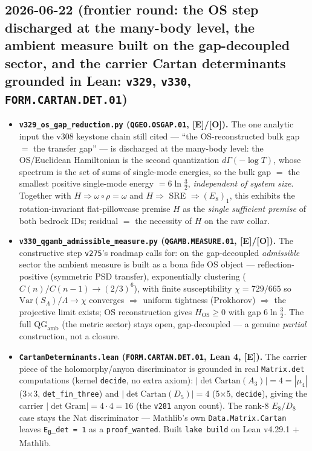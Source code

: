 \documentclass[11pt]{article}
\providecommand{\mE}{\textbf{[E]}}\providecommand{\mC}{\textbf{[C]}}
\providecommand{\mO}{\textbf{[O]}}\providecommand{\mX}{\textbf{[X]}}
\begin{document}
\subsection*{2026-06-22 (frontier round: the OS step discharged at the many-body level, the ambient measure built on the gap-decoupled sector, and the carrier Cartan determinants grounded in Lean: \texttt{v329}, \texttt{v330}, \texttt{FORM.CARTAN.DET.01})}
\begin{itemize}
\item \textbf{\texttt{v329\_os\_gap\_reduction.py} (\texttt{QGEO.OSGAP.01}, \mE/\mO).} The one analytic input the v308
  keystone chain still cited --- ``the OS-reconstructed bulk gap $=$ the transfer gap'' --- is discharged at the
  many-body level: the OS/Euclidean Hamiltonian is the second quantization $d\Gamma(-\log T)$, whose spectrum is the
  set of sums of single-mode energies, so the bulk gap $=$ the smallest positive single-mode energy $=6\ln\tfrac32$,
  \emph{independent of system size}.  Together with $H\Rightarrow\omega\circ\rho{=}\omega$ and $H\Rightarrow$ SRE
  $\Rightarrow(E_8)_1$, this exhibits the rotation-invariant flat-pillowcase premise $H$ as the \emph{single
  sufficient premise} of both bedrock IDs; residual $=$ the necessity of $H$ on the raw collar.
\item \textbf{\texttt{v330\_qgamb\_admissible\_measure.py} (\texttt{QGAMB.MEASURE.01}, \mE/\mO).} The constructive
  step \texttt{v275}'s roadmap calls for: on the gap-decoupled \emph{admissible} sector the ambient measure is built
  as a bona fide OS object --- reflection-positive (symmetric PSD transfer), exponentially clustering
  ($C(n)/C(n{-}1)\to(2/3)^6$), with finite susceptibility $\chi=729/665$ so $\mathrm{Var}(S_\Lambda)/\Lambda\to\chi$
  converges $\Rightarrow$ uniform tightness (Prokhorov) $\Rightarrow$ the projective limit exists; OS reconstruction
  gives $H_{\mathrm{OS}}\ge0$ with gap $6\ln\tfrac32$.  The full $\mathrm{QG}_{\mathrm{amb}}$ (the metric sector)
  stays open, gap-decoupled --- a genuine \emph{partial} construction, not a closure.
\item \textbf{\texttt{CartanDeterminants.lean} (\texttt{FORM.CARTAN.DET.01}, Lean 4, \mE).} The carrier piece of the
  holomorphy/anyon discriminator is grounded in real \texttt{Matrix.det} computations (kernel \texttt{decide}, no
  extra axiom): $|\det\mathrm{Cartan}(A_3)|{=}4{=}|\mu_4|$ (3$\times$3, \texttt{det\_fin\_three}) and
  $|\det\mathrm{Cartan}(D_5)|{=}4$ (5$\times$5, \texttt{decide}), giving the carrier $|\det\mathrm{Gram}|{=}4\cdot4{=}16$
  (the \texttt{v281} anyon count).  The rank-8 $E_8/D_8$ case stays the Nat discriminator --- Mathlib's own
  \texttt{Data.Matrix.Cartan} leaves \texttt{E\textsubscript{8}\_det = 1} as a \texttt{proof\_wanted}.  Built
  \texttt{lake build} on Lean v4.29.1 $+$ Mathlib.
\end{itemize}
\end{document}
